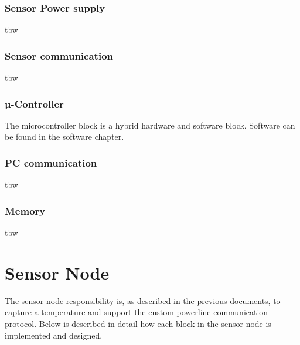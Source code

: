 \subsubsection{Sensor Power supply}
tbw

\subsubsection{Sensor communication}
tbw
%




\subsubsection{µ-Controller}
The microcontroller block is a hybrid hardware and software block. Software can be found in the software chapter.\\


\subsubsection{PC communication}
tbw

\subsubsection{Memory}
tbw

\section{Sensor Node}
The sensor node responsibility is, as described in the previous documents, to capture a temperature and support the custom powerline communication protocol. Below is described in detail how each block in the sensor node is implemented and designed.

